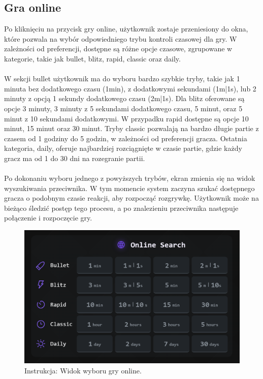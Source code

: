 \documentclass[12pt,a4paper]{article}
\begin{document}
\newpage

\subsection{Gra online}
Po kliknięciu na przycisk gry online, użytkownik zostaje przeniesiony do okna, które pozwala na wybór odpowiedniego trybu kontroli czasowej dla gry. W zależności od preferencji, dostępne są różne opcje czasowe, zgrupowane w kategorie, takie jak bullet, blitz, rapid, classic oraz daily.
\\\\
W sekcji bullet użytkownik ma do wyboru bardzo szybkie tryby, takie jak 1 minuta bez dodatkowego czasu (1min), z dodatkowymi sekundami (1m|1s), lub 2 minuty z opcją 1 sekundy dodatkowego czasu (2m|1s). Dla blitz oferowane są opcje 3 minuty, 3 minuty z 5 sekundami dodatkowego czasu, 5 minut, oraz 5 minut z 10 sekundami dodatkowymi. W przypadku rapid dostępne są opcje 10 minut, 15 minut oraz 30 minut. Tryby classic pozwalają na bardzo długie partie z czasem od 1 godziny do 5 godzin, w zależności od preferencji gracza. Ostatnia kategoria, daily, oferuje najbardziej rozciągnięte w czasie partie, gdzie każdy gracz ma od 1 do 30 dni na rozegranie partii.
\\\\
Po dokonaniu wyboru jednego z powyższych trybów, ekran zmienia się na widok wyszukiwania przeciwnika. W tym momencie system zaczyna szukać dostępnego gracza o podobnym czasie reakcji, aby rozpocząć rozgrywkę. Użytkownik może na bieżąco śledzić postęp tego procesu, a po znalezieniu przeciwnika następuje połączenie i rozpoczęcie gry.

\vspace{0.5cm}
\begin{figure}[h!]
    \centering
    \includegraphics[width=1\textwidth]{images/ins_min_pvp.png}
    \caption{Instrukcja: Widok wyboru gry online.}
\end{figure}
\end{document}
